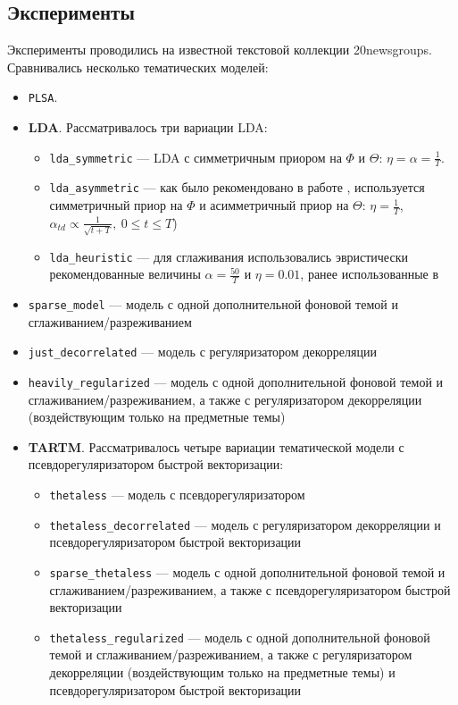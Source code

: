 \subsection{Эксперименты}

Эксперименты проводились на известной текстовой коллекции 20newsgroups. Сравнивались несколько тематических моделей:

\begin{itemize}
    \item \texttt{PLSA}.
    \item \textbf{LDA}. Рассматривалось три вариации LDA:
    \begin{itemize}
        \item \texttt{lda\_symmetric} --- LDA с симметричным приором на $\Phi$ и $\Theta$: $\eta = \alpha = \frac{1}{T}$.
        \item \texttt{lda\_asymmetric} --- как было рекомендовано в работе \cite{wallach2009rethinking}, используется симметричный приор на $\Phi$ и асимметричный приор на $\Theta$: $\eta=\frac{1}{T}$, $\alpha_{td}\propto\frac{1}{\sqrt{t + T}},~0\leq t \leq T$)
        \item \texttt{lda\_heuristic} --- для сглаживания использовались эвристически рекомендованные величины $\alpha=\frac{50}{T}$ и $\eta=0.01$, ранее использованные в \cite{biggers2014configuring}\cite{rosen2016mobile}
    \end{itemize}

    \item \texttt{sparse\_model} --- модель с одной дополнительной фоновой темой и сглаживанием/разреживанием
    \item \texttt{just\_decorrelated} --- модель с регуляризатором декорреляции
    \item \texttt{heavily\_regularized} --- модель с одной дополнительной фоновой темой и сглаживанием/разреживанием, а также с регуляризатором декорреляции (воздействующим только на предметные темы)
    \item \textbf{TARTM}. Рассматривалось четыре вариации тематической модели с псевдорегуляризатором быстрой векторизации:
    \begin{itemize}
        \item \texttt{thetaless} --- модель с псевдорегуляризатором
        \item \texttt{thetaless\_decorrelated} --- модель с регуляризатором декорреляции и псевдорегуляризатором быстрой векторизации
        \item \texttt{sparse\_thetaless} --- модель с одной дополнительной фоновой темой и сглаживанием/разреживанием, а также с псевдорегуляризатором быстрой векторизации
        \item \texttt{thetaless\_regularized} --- модель с одной дополнительной фоновой темой и сглаживанием/разреживанием, а также с регуляризатором декорреляции (воздействующим только на предметные темы) и псевдорегуляризатором быстрой векторизации
    \end{itemize}
\end{itemize}

